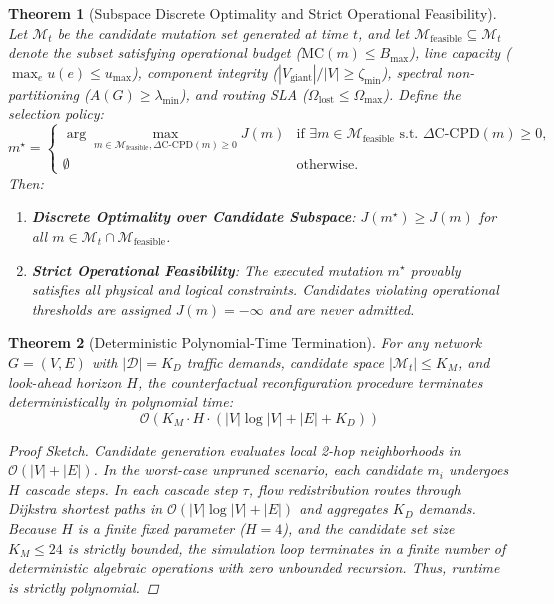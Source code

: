 \documentclass[pdflatex,sn-mathphys-num]{sn-jnl}
\theoremstyle{thmstyleone}
\newtheorem{theorem}{Theorem}
\theoremstyle{thmstyletwo}
\theoremstyle{thmstylethree}
\begin{document}
\begin{theorem}[Subspace Discrete Optimality and Strict Operational Feasibility]
Let $\mathcal{M}_t$ be the candidate mutation set generated at time $t$, and let $\mathcal{M}_{\mathrm{feasible}} \subseteq \mathcal{M}_t$ denote the subset satisfying operational budget ($\mathrm{MC}(m) \le B_{\max}$), line capacity ($\max_e u(e) \le u_{\max}$), component integrity ($|V_{\mathrm{giant}}|/|V| \ge \zeta_{\min}$), spectral non-partitioning ($A(G) \ge \lambda_{\min}$), and routing SLA ($\Omega_{\mathrm{lost}} \le \Omega_{\max}$). Define the selection policy:
\begin{equation}
m^\star = \begin{cases}
\arg\max_{m \in \mathcal{M}_{\mathrm{feasible}}, \Delta \mathrm{C\text{-}CPD}(m) \ge 0} J(m) & \text{if } \exists m \in \mathcal{M}_{\mathrm{feasible}} \text{ s.t. } \Delta \mathrm{C\text{-}CPD}(m) \ge 0, \\
\emptyset & \text{otherwise.}
\end{cases}
\end{equation}
Then:
\begin{enumerate}
    \item \textbf{Discrete Optimality over Candidate Subspace}: $J(m^\star) \ge J(m)$ for all $m \in \mathcal{M}_t \cap \mathcal{M}_{\mathrm{feasible}}$.
    \item \textbf{Strict Operational Feasibility}: The executed mutation $m^\star$ provably satisfies all physical and logical constraints. Candidates violating operational thresholds are assigned $J(m) = -\infty$ and are never admitted.
\end{enumerate}
\end{theorem}

\begin{theorem}[Deterministic Polynomial-Time Termination]
For any network $G = (V, E)$ with $|\mathcal{D}| = K_D$ traffic demands, candidate space $|\mathcal{M}_t| \le K_M$, and look-ahead horizon $H$, the counterfactual reconfiguration procedure terminates deterministically in polynomial time:
\begin{equation}
\mathcal{O}(K_M \cdot H \cdot (|V| \log |V| + |E| + K_D))
\end{equation}
\begin{proof}[Proof Sketch]
Candidate generation evaluates local 2-hop neighborhoods in $\mathcal{O}(|V| + |E|)$. In the worst-case unpruned scenario, each candidate $m_i$ undergoes $H$ cascade steps. In each cascade step $\tau$, flow redistribution routes through Dijkstra shortest paths in $\mathcal{O}(|V| \log |V| + |E|)$ and aggregates $K_D$ demands. Because $H$ is a finite fixed parameter ($H=4$), and the candidate set size $K_M \le 24$ is strictly bounded, the simulation loop terminates in a finite number of deterministic algebraic operations with zero unbounded recursion. Thus, runtime is strictly polynomial.
\end{proof}
\end{theorem}
\end{document}
